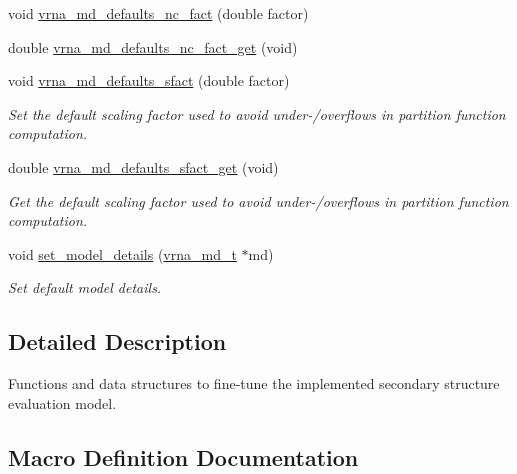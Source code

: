 \begin{DoxyCompactItemize}
void \hyperlink{group__model__details_gac35e596c850dce3ad55c49119fd7d471}{vrna\+\_\+md\+\_\+defaults\+\_\+nc\+\_\+fact} (double factor)
\item 
double \hyperlink{group__model__details_ga7ac759eaa7159bf5f022745f5da59508}{vrna\+\_\+md\+\_\+defaults\+\_\+nc\+\_\+fact\+\_\+get} (void)
\item 
void \hyperlink{group__model__details_ga3f73d3029d3d0025d4cc311510cd95a3}{vrna\+\_\+md\+\_\+defaults\+\_\+sfact} (double factor)
\begin{DoxyCompactList}\small\item\em Set the default scaling factor used to avoid under-\//overflows in partition function computation. \end{DoxyCompactList}\item 
double \hyperlink{group__model__details_gab2df6aab954b63fd3592d18e90285dae}{vrna\+\_\+md\+\_\+defaults\+\_\+sfact\+\_\+get} (void)
\begin{DoxyCompactList}\small\item\em Get the default scaling factor used to avoid under-\//overflows in partition function computation. \end{DoxyCompactList}\item 
void \hyperlink{group__model__details_gabad896c3650d420f3f3ddefc69e2bceb}{set\+\_\+model\+\_\+details} (\hyperlink{group__model__details_ga1f8a10e12a0a1915f2a4eff0b28ea17c}{vrna\+\_\+md\+\_\+t} $\ast$md)
\begin{DoxyCompactList}\small\item\em Set default model details. \end{DoxyCompactList}\end{DoxyCompactItemize}


\subsection{Detailed Description}
Functions and data structures to fine-\/tune the implemented secondary structure evaluation model. 



\subsection{Macro Definition Documentation}
